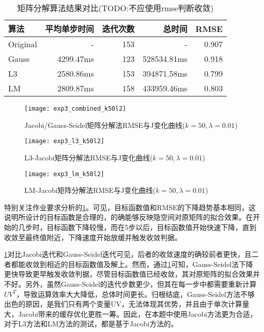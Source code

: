 \documentclass[a4paper,12pt]{article}
\begin{document}
    \begin{table}
      \centering
      \caption{矩阵分解算法结果对比(TODO:不应使用rmse判断收敛)}
      \label{tbl:exp3}
      \begin{tabular}{lrrrr}
        \toprule
        算法&平均单步时间&迭代次数&总时间&RMSE\\
        \midrule
        Original & - & 153 & - & 0.907 \\
        Gauss & 4299.47ms & 123 & 528534.81ms & 0.918 \\
        L3 & 2580.86ms & 153 & 394871.58ms & 0.799 \\
        LM & 2809.87ms & 158 & 433959.46ms & 0.803 \\
        \bottomrule
      \end{tabular}
    \end{table}

    \begin{figure}[htbp]
      \centering
      \texttt{[image: exp3\_combined\_k50l2]}
      \caption{Jacobi/Gauss-Seidel矩阵分解法RMSE与J变化曲线($k=50,\lambda=0.01$)}
      \label{fig:exp3_k50l2}
    \end{figure}
    \begin{figure}[htbp]
      \centering
      \texttt{[image: exp3\_l3\_k50l2]}
      \caption{L3-Jacobi矩阵分解法RMSE与J变化曲线($k=50,\lambda=0.01$)}
      \label{fig:exp3_l3_k50l2}
    \end{figure}
    \begin{figure}[htbp]
      \centering
      \texttt{[image: exp3\_lm\_k50l2]}
      \caption{LM-Jacobi矩阵分解法RMSE与J变化曲线($k=50,\lambda=0.01$)}
      \label{fig:exp3_lm_k50l2}
    \end{figure}

    特别关注作业要求分析的\cref{fig:exp3_k50l2}。可见，目标函数值和RMSE的下降趋势基本相同，这说明所设计的目标函数是合理的，的确能够反映隐空间对原矩阵的拟合效果。在开始的几步时，目标函数下降较慢，而在5步以后，目标函数值开始快速下降，直到收敛至最终值附近，下降速度开始放缓并触发收敛判据。

    \cref{fig:exp3_k50l2}对比Jacobi迭代和Gauss-Seidel迭代可见，后者的收敛速度的确较前者更快，且二者都能收敛到相近的目标函数值及解上。然而，通过\cref{tbl:exp3}可知，Gauss-Seidel法下降更快导致更早触发收敛判据，尽管目标函数值已经收敛，其对原矩阵的拟合效果并不好。另外，虽然Gauss-Seidel的迭代步数更少，但其在每一步中都需要重新计算$UV^T$，导致运算效率大大降低，总体时间更长。归根结底，Gauss-Seidel方法不够出色的原因，是我们只有两个变量UV，无法体现其优势，并且由于单次计算量大，Jacobi带来的缓存优化更胜一筹。因此，在本题中使用Jacobi方法更为合适，对于L3方法和LM方法的测试，都是基于Jacobi方法的。
\end{document}
